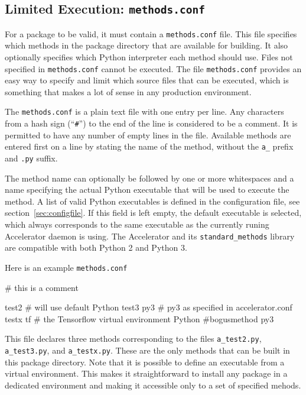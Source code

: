 \subsection{Limited Execution:  \texttt{methods.conf}}
\label{sec:methods_conf}
For a package to be valid, it must contain a \texttt{methods.conf}
file.  This file specifies which methods in the package directory that
are available for building.  It also optionally specifies which Python
interpreter each method should use.  Files not specified in
\texttt{methods.conf} cannot be executed.  The file
\texttt{methods.conf} provides an easy way to specify and limit which
source files that can be executed, which is something that makes a lot
of sense in any production environment.

The \texttt{methods.conf} is a plain text file with one entry per
line.  Any characters from a hash sign (``\texttt{\#}'') to the end of
the line is considered to be a comment.  It is permitted to have any
number of empty lines in the file.  Available methods are entered
first on a line by stating the name of the method, without the
\texttt{a\_} prefix and \texttt{.py} suffix.

The method name can optionally be followed by one or more whitespaces
and a name specifying the actual Python executable that will be used
to execute the method.  A list of valid Python executables is defined
in the configuration file, see section~\ref{sec:configfile}.  If this
field is left empty, the default executable is selected, which always
corresponds to the same executable as the currently runing Accelerator
daemon is using.  The Accelerator and its \texttt{standard\_methods}
library are compatible with both Python 2 and Python 3.

Here is an example \texttt{methods.conf}
\begin{shell}
# this is a comment

test2                # will use default Python
test3           py3  # py3 as specified in accelerator.conf
testx           tf   # the Tensorflow virtual environment Python
#bogusmethod    py3
\end{shell}
This file declares three methods corresponding to the files
\texttt{a\_test2.py}, \texttt{a\_test3.py}, and \texttt{a\_testx.py}.
These are the only methods that can be built in this package
directory.  Note that it is possible to define an executable from a
virtual environment.  This makes it straightforward to install any
package in a dedicated environment and making it accessible only to a
set of specified mehods.




